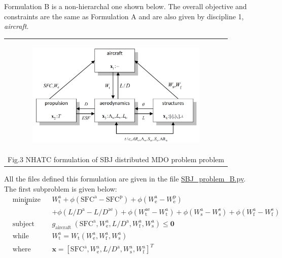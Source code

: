 \documentclass[11pt]{article}
\begin{document}
Formulation B is a non-hierarchal one shown below. The overall objective
and constraints are the same as Formulation A and are also given by
discipline 1, \emph{aircraft}.

\begin{longtable}[]{@{}c@{}}
    \toprule
    \endhead
    \begin{minipage}[t]{0.97\columnwidth}\centering
        \begin{figure}
            \centering
            \includegraphics[height=5cm]{images/SBJ_schematics_003.png}
        \end{figure}\strut
    \end{minipage}\tabularnewline
    \begin{minipage}[t]{0.97\columnwidth}\centering
        Fig.3 NHATC formulation of SBJ distributed MDO problem
problem\strut
    \end{minipage}\tabularnewline
    \bottomrule
\end{longtable}

All the files defined this formulation are given in the file
\url{SBJ_problem_B.py}. The first subproblem is given below:
\begin{equation*}
    \begin{aligned}
        & \underset{\mathbf{x}}{\text{minimize}}
        & & W_{\mathrm{t}}^{\mathrm{a}}+\phi\left(\mathrm{SFC}^{\mathrm{a}}-\mathrm{SFC}^{\mathrm{p}}\right)+\phi\left(W_{\mathrm{e}}^{\mathrm{a}}-W_{\mathrm{e}}^{\mathrm{p}}\right)\\
    & & & +\phi\left(L / D^{\mathrm{a}}-L / D^{\mathrm{ae}}\right)+\phi\left(W_{\mathrm{t}}^{\mathrm{ae}}-W_{\mathrm{t}}^{\mathrm{a}}\right)+\phi\left(W_{\mathrm{s}}^{\mathrm{a}}-W_{\mathrm{s}}^{\mathrm{s}}\right)+\phi\left(W_{\mathrm{f}}^{\mathrm{a}}-W_{\mathrm{f}}^{\mathrm{s}}\right) \\
        & \text{subject to}
        & & g_{\text {aircraft }}\left(\mathrm{SFC}^{\mathrm{a}}, W_{\mathrm{e}}^{\mathrm{a}}, L / D^{\mathrm{a}}, W_{\mathrm{f}}^{\mathrm{a}}, W_{\mathrm{s}}^{\mathrm{a}}\right) \leq \mathbf{0} \\
    & \text{while solving}
        & & W_{\mathrm{t}}^{\mathrm{a}}=W_{\mathrm{t}}\left(W_{\mathrm{e}}^{\mathrm{a}}, W_{\mathrm{f}}^{\mathrm{a}}, W_{\mathrm{s}}^{\mathrm{a}}\right)\\
    & \text{where}
        & & \mathbf{x} = \left[\mathrm{SFC}^{\mathrm{a}}, W_{\mathrm{e}}^{\mathrm{a}}, L / D^{\mathrm{a}}, W_{\mathrm{s}}^{\mathrm{a}}, W_{\mathrm{f}}^{\mathrm{a}}\right]^\textit{T}
    \end{aligned}
\end{equation*}
\end{document}
